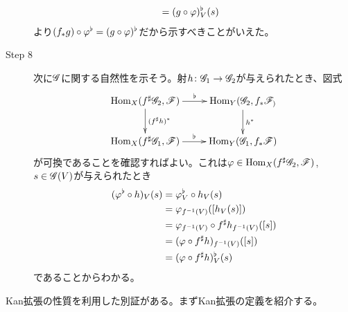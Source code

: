 \begin{description}
\begin{align*}
    &= (g \circ {\varphi})^{\flat}_V (s)
  \end{align*}
  より$(f_* g) \circ {\varphi}^{\flat} = (g \circ {\varphi})^{\flat}$だから示すべきことがいえた。
    \item[Step 8] 次に$\mathscr{G}$に関する自然性を示そう。射$h \colon \mathscr{G}_1 \to \mathscr{G}_2$が与えられたとき、図式
    \[
    \xymatrix{
    \Hom_X(f\sh\scrg_2, \scrf) \ar[r]^-{\flat} \ar[d]^-{(f\sh h)^*} & \Hom_Y(\scrg_2,f_*\scrf_) \ar[d]^-{h^*} \\
    \Hom_X(f\sh\scrg_1, \scrf) \ar[r]^-{\flat} & \Hom_Y(\scrg_1,f_*\scrf)
    }
    \]
    が可換であることを確認すればよい。これは${\varphi} \in \operatorname{Hom}_X(f^{\sharp}\mathscr{G}_2, \mathscr{F})$, $s \in \mathscr{G}(V)$が与えられたとき
    \begin{align*}
      ({\varphi}^{\flat} \circ h)_V (s) &= {\varphi}^{\flat}_V \circ h_V (s) \\
      &= {\varphi}_{f^{-1}(V)} ( [h_V(s)]) \\
      &= {\varphi}_{f^{-1}(V)} \circ f^{\sharp} h_{f^{-1}(V)} ([s]) \\
      &= ({\varphi} \circ f^{\sharp} h)_{f^{-1}(V)} ([s]) \\
      &= ({\varphi} \circ f^{\sharp} h )_V^{\flat} (s)
    \end{align*}
    であることからわかる。
\end{description}

\begin{ano}
  Kan拡張の性質を利用した別証がある。まずKan拡張の定義を紹介する。
\end{ano}

